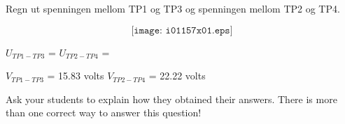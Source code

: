 

Regn ut spenningen mellom TP1 og TP3 og spenningen mellom TP2 og TP4. 

$$\texttt{[image: i01157x01.eps]}$$

$U_{TP1-TP3}$ = \hskip 40pt $U_{TP2-TP4}$ = 

\vskip 10pt







$V_{TP1-TP3}$ = 15.83 volts \hskip 20pt $V_{TP2-TP4}$ = 22.22 volts







Ask your students to explain how they obtained their answers.  There is more than one correct way to answer this question!




